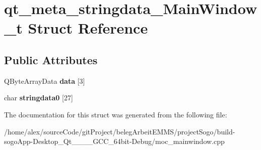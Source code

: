 \hypertarget{structqt__meta__stringdata__MainWindow__t}{\section{qt\-\_\-meta\-\_\-stringdata\-\_\-\-Main\-Window\-\_\-t Struct Reference}
\label{structqt__meta__stringdata__MainWindow__t}
}
\subsection*{Public Attributes}
\begin{DoxyCompactItemize}
\item 
\hypertarget{structqt__meta__stringdata__MainWindow__t_a57fa3c95fe3369c27742583e27775ea0}{Q\-Byte\-Array\-Data {\bfseries data} \mbox{[}3\mbox{]}}\label{structqt__meta__stringdata__MainWindow__t_a57fa3c95fe3369c27742583e27775ea0}

\item 
\hypertarget{structqt__meta__stringdata__MainWindow__t_a1e30e477cc405dc7d6f973f823d0dd38}{char {\bfseries stringdata0} \mbox{[}27\mbox{]}}\label{structqt__meta__stringdata__MainWindow__t_a1e30e477cc405dc7d6f973f823d0dd38}

\end{DoxyCompactItemize}


The documentation for this struct was generated from the following file\-:\begin{DoxyCompactItemize}
\item 
/home/alex/source\-Code/git\-Project/beleg\-Arbeit\-E\-M\-M\-S/project\-Sogo/build-\/sogo\-App-\/\-Desktop\-\_\-\-Qt\-\_\-\_\-\_\-\_\-\-G\-C\-C\-\_\-64bit-\/\-Debug/moc\-\_\-mainwindow.\-cpp\end{DoxyCompactItemize}
